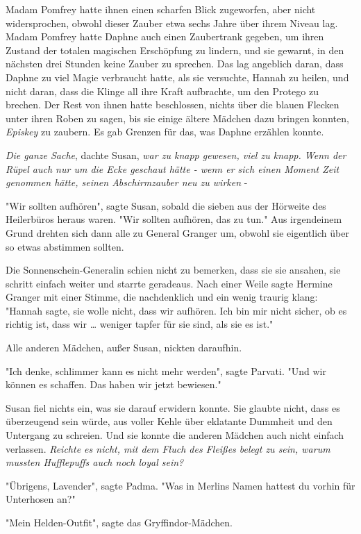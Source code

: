 {Madam Pomfrey hatte ihnen einen scharfen Blick zugeworfen, aber nicht widersprochen, obwohl dieser Zauber etwa sechs Jahre über ihrem Niveau lag. Madam Pomfrey hatte Daphne auch einen Zaubertrank gegeben, um ihren Zustand der totalen magischen Erschöpfung zu lindern, und sie gewarnt, in den nächsten drei Stunden keine Zauber zu sprechen. Das lag angeblich daran, dass Daphne zu viel Magie verbraucht hatte, als sie versuchte, Hannah zu heilen, und nicht daran, dass die Klinge all ihre Kraft aufbrachte, um den Protego zu brechen. Der Rest von ihnen hatte beschlossen, nichts über die blauen Flecken unter ihren Roben zu sagen, bis sie einige ältere Mädchen dazu bringen konnten, \emph{Episkey} zu zaubern. Es gab Grenzen für das, was Daphne erzählen konnte.

\emph{Die ganze Sache}, dachte Susan, \emph{war zu knapp gewesen, viel zu knapp. Wenn der Rüpel auch nur um die Ecke geschaut hätte - wenn er sich einen Moment Zeit genommen hätte, seinen Abschirmzauber neu zu wirken} -

"Wir sollten aufhören", sagte Susan, sobald die sieben aus der Hörweite des Heilerbüros heraus waren. "Wir sollten aufhören, das zu tun." Aus irgendeinem Grund drehten sich dann alle zu General Granger um, obwohl sie eigentlich über so etwas abstimmen sollten.

Die Sonnenschein-Generalin schien nicht zu bemerken, dass sie sie ansahen, sie schritt einfach weiter und starrte geradeaus. Nach einer Weile sagte Hermine Granger mit einer Stimme, die nachdenklich und ein wenig traurig klang: "Hannah sagte, sie wolle nicht, dass wir aufhören. Ich bin mir nicht sicher, ob es richtig ist, dass wir … weniger tapfer für sie sind, als sie es ist."

Alle anderen Mädchen, außer Susan, nickten daraufhin.

"Ich denke, schlimmer kann es nicht mehr werden", sagte Parvati. "Und wir können es schaffen. Das haben wir jetzt bewiesen."

Susan fiel nichts ein, was sie darauf erwidern konnte. Sie glaubte nicht, dass es überzeugend sein würde, aus voller Kehle über eklatante Dummheit und den Untergang zu schreien. Und sie konnte die anderen Mädchen auch nicht einfach verlassen. \emph{Reichte es nicht, mit dem Fluch des Fleißes belegt zu sein, warum mussten Hufflepuffs auch noch loyal sein?}

"Übrigens, Lavender", sagte Padma. "Was in Merlins Namen hattest du vorhin für Unterhosen an?"

"Mein Helden-Outfit", sagte das Gryffindor-Mädchen.

}
